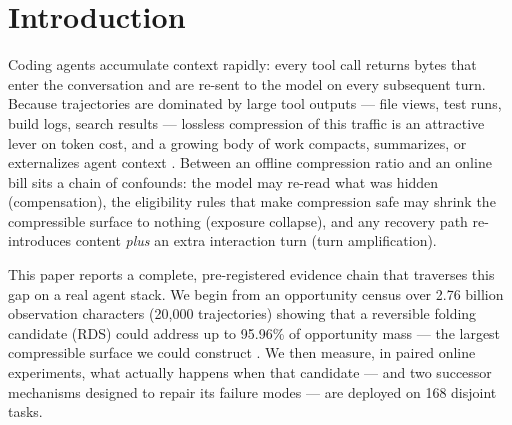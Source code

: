 \documentclass[twocolumn]{svjour3}       %
\begin{document}
\section{Introduction}
\label{intro}
Coding agents accumulate context rapidly: every tool call returns bytes that enter the
conversation and are re-sent to the model on every subsequent turn. Because trajectories
are dominated by large tool outputs --- file views, test runs, build logs, search results
--- lossless compression of this traffic is an attractive lever on token cost, and a
growing body of work compacts, summarizes, or externalizes agent context
\cite{agentdiet2026,attncompress2026,acon2026,squeez2026,taco2026}. Between an offline
compression ratio and an online bill sits a chain of confounds: the model may re-read
what was hidden (compensation), the eligibility rules that make compression safe may
shrink the compressible surface to nothing (exposure collapse), and any recovery path
re-introduces content \emph{plus} an extra interaction turn (turn amplification).

This paper reports a complete, pre-registered evidence chain that traverses this gap on
a real agent stack. We begin from an opportunity census over 2.76 billion observation
characters (20{,}000 trajectories) showing that a reversible folding candidate (RDS)
could address up to 95.96\% of opportunity mass --- the largest compressible surface we
could construct \cite{paperA2026}. We then measure, in paired online experiments, what
actually happens when that candidate --- and two successor mechanisms designed to repair
its failure modes --- are deployed on 168 disjoint tasks.
\end{document}
